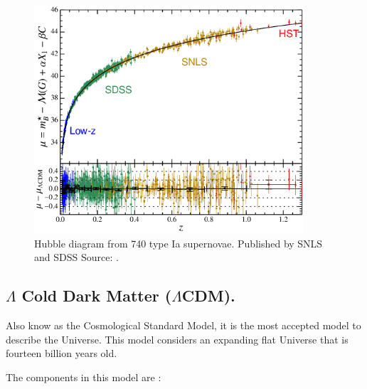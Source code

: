 \documentclass[onecolumn,           %
               showpacs,            %
               preprintnumbers,     %
               aps,                 %
               prl,          	    %
               letterpaper,             %
               superscriptaddress,      %
               nofootinbib,         %
               tightenlines,        %
               floats,floatfix      %
               ,usenatbib,
               ]{revtex4-1}
\begin{document}
\begin{figure}[h]
	\centering
	\includegraphics[width=10cm]{FiguresCosmo/snls_fig2.png}	
	\caption{Hubble diagram from 740 type Ia supernovae. Published by SNLS and SDSS Source: \cite{snls}.}
	\label{jla}
\end{figure}

\subsection{$\Lambda$ Cold Dark Matter ($\Lambda$CDM).}
Also know as the Cosmological Standard Model, it is the most accepted model to describe the Universe. This model considers an expanding flat Universe that is fourteen billion years old. 

The components in this model are \cite{liddle}:
\end{document}
